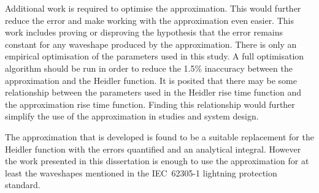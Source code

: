 Additional work is required to optimise the approximation. This would further reduce the error and make working with the approximation even easier. This work includes proving or disproving the hypothesis that the error remains constant for any waveshape produced by the approximation. There is only an empirical optimisation of the parameters used in this study. A full optimisation algorithm should be run in order to reduce the 1.5\% inaccuracy between the approximation and the Heidler function. It is posited that there may be some relationship between the parameters used in the Heidler rise time function and the approximation rise time function. Finding this relationship would further simplify the use of the approximation in studies and system design.

The approximation that is developed is found to be a suitable replacement for the Heidler function with the errors quantified and an analytical integral.
However the work presented in this dissertation is enough to use the approximation for at least the waveshapes mentioned in the IEC~62305-1 lightning protection standard.
